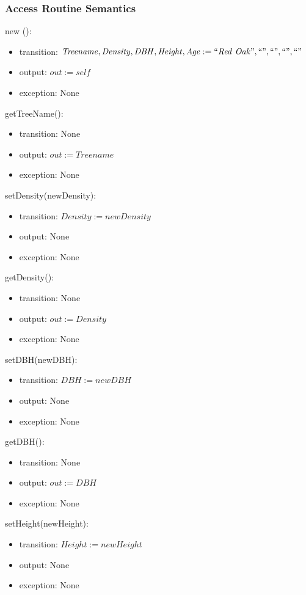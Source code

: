 \documentclass[12pt, titlepage]{article}
\begin{document}
\subsubsection{Access Routine Semantics}

\noindent new \tmn():
\begin{itemize}
\item transition: $\mathit{Treename, Density, DBH, Height,
Age := ``Red\ Oak", ``", ``", ``", ``"}$
\item output: $\mathit{out := self}$
\item exception: None 
\end{itemize}
\noindent getTreeName():
\begin{itemize}
\item transition: None
\item output: $\mathit{out := Treename}$
\item exception: None
\end{itemize}
\noindent setDensity(newDensity):
\begin{itemize}
\item transition: $\mathit{Density := newDensity}$
\item output: None
\item exception: None
\end{itemize}
\noindent getDensity():
\begin{itemize}
\item transition: None
\item output: $\mathit{out := Density}$
\item exception: None
\end{itemize}
\noindent setDBH(newDBH):
\begin{itemize}
\item transition: $\mathit{DBH := newDBH}$
\item output: None
\item exception: None
\end{itemize}
\noindent getDBH():
\begin{itemize}
\item transition: None
\item output: $\mathit{out := DBH}$
\item exception: None
\end{itemize}
\noindent setHeight(newHeight):
\begin{itemize}
\item transition: $\mathit{Height := newHeight}$
\item output: None
\item exception: None
\end{itemize}
\end{document}
